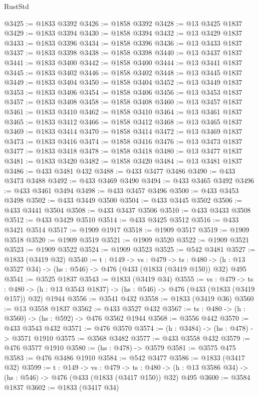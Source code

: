 \begin{lexlean}{RustStd}
\begin{coremodule}
@3425 := @1833 @3392
@3426 := @1858 @3392
@3428 := @13 @3425 @1837
@3429 := @1833 @3394
@3430 := @1858 @3394
@3432 := @13 @3429 @1837
@3433 := @1833 @3396
@3434 := @1858 @3396
@3436 := @13 @3433 @1837
@3437 := @1833 @3398
@3438 := @1858 @3398
@3440 := @13 @3437 @1837
@3441 := @1833 @3400
@3442 := @1858 @3400
@3444 := @13 @3441 @1837
@3445 := @1833 @3402
@3446 := @1858 @3402
@3448 := @13 @3445 @1837
@3449 := @1833 @3404
@3450 := @1858 @3404
@3452 := @13 @3449 @1837
@3453 := @1833 @3406
@3454 := @1858 @3406
@3456 := @13 @3453 @1837
@3457 := @1833 @3408
@3458 := @1858 @3408
@3460 := @13 @3457 @1837
@3461 := @1833 @3410
@3462 := @1858 @3410
@3464 := @13 @3461 @1837
@3465 := @1833 @3412
@3466 := @1858 @3412
@3468 := @13 @3465 @1837
@3469 := @1833 @3414
@3470 := @1858 @3414
@3472 := @13 @3469 @1837
@3473 := @1833 @3416
@3474 := @1858 @3416
@3476 := @13 @3473 @1837
@3477 := @1833 @3418
@3478 := @1858 @3418
@3480 := @13 @3477 @1837
@3481 := @1833 @3420
@3482 := @1858 @3420
@3484 := @13 @3481 @1837
@3486 := @433 @3481 @432
@3488 := @433 @3477 @3486
@3490 := @433 @3473 @3488
@3492 := @433 @3469 @3490
@3494 := @433 @3465 @3492
@3496 := @433 @3461 @3494
@3498 := @433 @3457 @3496
@3500 := @433 @3453 @3498
@3502 := @433 @3449 @3500
@3504 := @433 @3445 @3502
@3506 := @433 @3441 @3504
@3508 := @433 @3437 @3506
@3510 := @433 @3433 @3508
@3512 := @433 @3429 @3510
@3514 := @433 @3425 @3512
@3516 := @433 @3421 @3514
@3517 := @1909 @1917
@3518 := @1909 @3517
@3519 := @1909 @3518
@3520 := @1909 @3519
@3521 := @1909 @3520
@3522 := @1909 @3521
@3523 := @1909 @3522
@3524 := @1909 @3523
@3525 := @542 @3481
@3527 := @1833 (@3419 @32)
@3540 := {t : @149} ->
  {vs : @479} ->
  {ts : @480} -> (h : @13 @3527 @34) -> (hs : @546) -> @476 (@433 (@1833 (@3419 @150)) @32) @495
@3541 := @3525 @1837
@3543 := @1833 (@3419 @34)
@3555 := {vs : @479} ->
  {ts : @480} -> (h : @13 @3543 @1837) -> (hs : @546) -> @476 (@433 (@1833 (@3419 @157)) @32) @1944
@3556 := @3541 @432
@3558 := @1833 (@3419 @36)
@3560 := @13 @3558 @1837
@3562 := @433 @3527 @432
@3567 := {ts : @480} -> (h : @3560) -> (hs : @592) -> @476 @3562 @1944
@3568 := @3556 @442
@3570 := @433 @3543 @432
@3571 := @476 @3570
@3574 := (h : @3484) -> (hs : @478) -> @3571 @1910
@3575 := @3568 @3482
@3577 := @433 @3558 @432
@3579 := @476 @3577 @1910
@3580 := (hs : @478) -> @3579
@3581 := @3575 @475
@3583 := @476 @3486 @1910
@3584 := @542 @3477
@3586 := @1833 (@3417 @32)
@3599 := {t : @149} ->
  {vs : @479} ->
  {ts : @480} -> (h : @13 @3586 @34) -> (hs : @546) -> @476 (@433 (@1833 (@3417 @150)) @32) @495
@3600 := @3584 @1837
@3602 := @1833 (@3417 @34)

\end{coremodule}
\end{lexlean}
